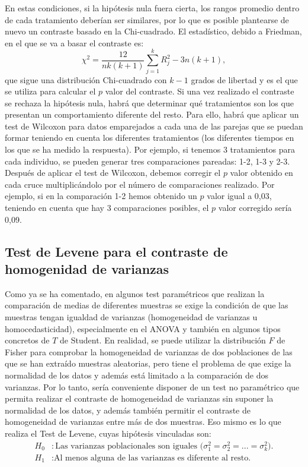\begin{description}
En estas condiciones, si la hipótesis nula fuera cierta, los rangos promedio dentro de cada tratamiento deberían ser similares, por lo que es posible plantearse de nuevo un contraste basado en la Chi-cuadrado. El estadístico, debido a Friedman, en el que se va a basar el contraste es:
\[
\chi^2 = \frac{12}{nk(k+1)}\sum_{j=1}^k R_j^2-3n(k+1),
\]
que sigue una distribución Chi-cuadrado con $k-1$ grados de libertad y es el que se utiliza para calcular el $p$ valor del contraste. Si una vez realizado el contraste se rechaza la hipótesis nula, habrá que determinar qué tratamientos son los que presentan un comportamiento diferente del resto. Para ello, habrá que aplicar un test de Wilcoxon para datos emparejados a cada una de las parejas que se puedan formar teniendo en cuenta los diferentes tratamientos (los diferentes tiempos en los que se ha medido la respuesta). Por ejemplo, si tenemos 3 tratamientos para cada individuo, se pueden generar tres comparaciones pareadas: 1-2, 1-3 y 2-3. Después de aplicar el test de Wilcoxon, debemos corregir el $p$ valor obtenido en cada cruce multiplicándolo por el número de comparaciones realizado. Por ejemplo, si en la comparación 1-2 hemos obtenido un $p$ valor igual a 0,03, teniendo en cuenta que hay 3 comparaciones posibles, el $p$ valor corregido sería 0,09.


\subsection{Test de Levene para el contraste de homogenidad de varianzas}

Como ya se ha comentado, en algunos test paramétricos que realizan la comparación de medias de diferentes muestras se exige la condición de que las muestras tengan igualdad de varianzas (homogeneidad de varianzas u homocedasticidad), especialmente en el ANOVA y también en algunos tipos concretos de $T$ de Student. En realidad, se puede utilizar la distribución $F$ de Fisher para comprobar la homogeneidad de varianzas de dos poblaciones de las que se han extraído muestras aleatorias, pero tiene el problema de que exige la normalidad de los datos y además está limitado a la comparación de dos varianzas. Por lo tanto, sería conveniente disponer de un test no paramétrico que permita realizar el contraste de homogeneidad de varianzas sin suponer la normalidad de los datos, y además también permitir el contraste de homogeneidad de varianzas entre más de dos muestras. Eso mismo es lo que realiza el Test de Levene, cuyas hipótesis vinculadas son:
\begin{align*}
H_0 &: \textrm{Las varianzas poblacionales son iguales ($\sigma^2_1=\sigma^2_2=...=\sigma^2_k$).}\\
H_1 &: \textrm{Al menos alguna de las varianzas es diferente al resto.}
\end{align*}


\end{description}
